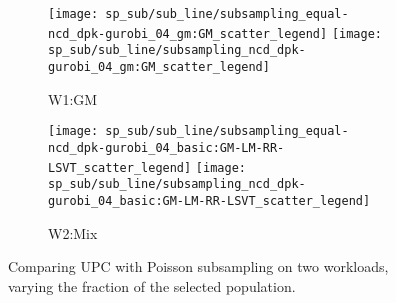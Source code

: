 \documentclass[conference,compsoc]{IEEEtran}
\begin{document}
\begin{figure}[ht]
    \begin{subfigure}[b]{0.48\columnwidth}
        \centering
        \texttt{[image: sp\_sub/sub\_line/subsampling\_equal-ncd\_dpk-gurobi\_04\_gm:GM\_scatter\_legend]}
        \texttt{[image: sp\_sub/sub\_line/subsampling\_ncd\_dpk-gurobi\_04\_gm:GM\_scatter\_legend]}
        \caption{W1:GM}

    \end{subfigure}
%
    \begin{subfigure}[b]{0.48\columnwidth}
        \texttt{[image: sp\_sub/sub\_line/subsampling\_equal-ncd\_dpk-gurobi\_04\_basic:GM-LM-RR-LSVT\_scatter\_legend]}
        \texttt{[image: sp\_sub/sub\_line/subsampling\_ncd\_dpk-gurobi\_04\_basic:GM-LM-RR-LSVT\_scatter\_legend]}
        \caption{W2:Mix}
    \end{subfigure}
%
    \caption{Comparing UPC with Poisson subsampling on two workloads, varying the fraction of the selected population.}
    \label{fig:sub}
\end{figure}
\end{document}
